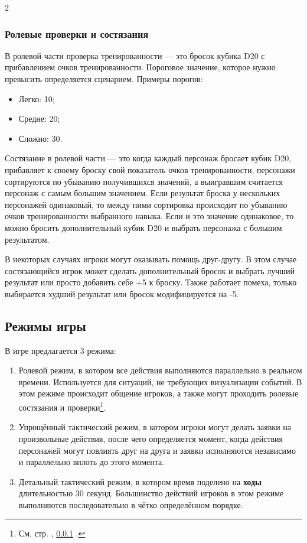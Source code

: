 \documentclass[twoside]{article}
\begin{document}
\begin{multicols}{2}
\subsubsection{Ролевые проверки и состязания}\label{role-checks}

В ролевой части проверка тренированности --- это бросок кубика D20 с
прибавлением очков тренированности. Пороговое значение, которое нужно
превысить определяется сценарием. Примеры порогов:

\begin{itemize}
\item
  Легко: 10;
\item
  Средне: 20;
\item
  Сложно: 30.
\end{itemize}

Состязание в ролевой части --- это когда каждый персонаж бросает кубик
D20, прибавляет к своему броску свой показатель очков тренированности,
персонажи сортируются по убыванию получившихся значений, а выигравшим
считается персонаж с самым большим значением. Если результат броска у
нескольких персонажей одинаковый, то между ними сортировка происходит по
убыванию очков тренированности выбранного навыка. Если и это значение
одинаковое, то можно бросить дополнительный кубик D20 и выбрать
персонажа с большим результатом.

В некоторых случаях игроки могут оказывать помощь друг-другу. В этом
случае состязающийся игрок может сделать дополнительный бросок и выбрать
лучший результат или просто добавить себе +5 к броску. Также работает
помеха, только выбирается худший результат или бросок модифицируется на
-5.

\subsection{Режимы игры}\label{game-modes}

В игре предлагается 3 режима:

\begin{enumerate}
\def\labelenumi{\arabic{enumi}.}
\item
  Ролевой режим, в котором все действия выполняются параллельно в
  реальном времени. Используется для ситуаций, не требующих визуализации
  событий. В этом режиме происходит общение игроков, а также могут
  проходить ролевые состязания и проверки\footnote{См. стр. \pageref{role-checks}, \ref{role-checks} .}.
\item
  Упрощённый тактический режим, в котором игроки могут делать заявки на
  произвольные действия, после чего определяется момент, когда действия
  персонажей могут повлиять друг на друга и заявки исполняются
  независимо и параллельно вплоть до этого момента.
\item
  Детальный тактический режим, в котором время поделено на \textbf{ходы}
  длительностью 30 секунд. Большинство действий игроков в этом режиме
  выполняются последовательно в чётко определённом порядке.
\end{enumerate}


\end{multicols}
\end{document}
